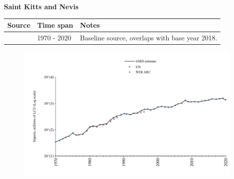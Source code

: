 \documentclass[12pt,a4paper,landscape]{article}
\begin{document}
\begin{adjustbox}{max totalsize={\paperwidth}{\paperheight},center}
\begin{minipage}[t][\textheight][t]{\textwidth}
\vspace*{0.5cm}
{}
\begin{center}
{\Large\bfseries Saint Kitts and Nevis}
\end{center}
\vspace{0.5cm}
\begin{table}[H]
\centering
\small
\begin{tabular}{|l|l|l|}
\hline
\textbf{Source} & \textbf{Time span} & \textbf{Notes} \\
\hline
\rowcolor{white}\cite{UN}& 1970 - 2020 &Baseline source, overlaps with base year 2018.\\
\hline
\end{tabular}
\end{table}
\begin{figure}[H]
\centering
\includegraphics[width=\textwidth,height=0.6\textheight,keepaspectratio]{graphs/KNA_imports.pdf}
\end{figure}
\end{minipage}
\end{adjustbox}
\end{document}
